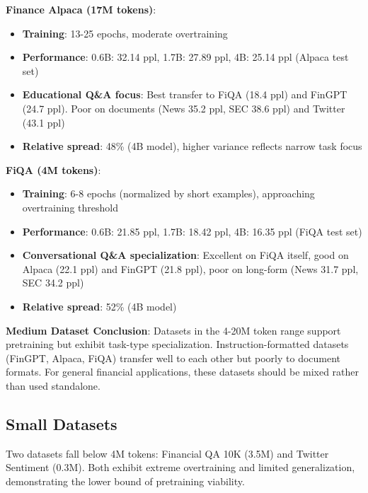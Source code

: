 \textbf{Finance Alpaca (17M tokens)}:
\begin{itemize}
\item \textbf{Training}: 13-25 epochs, moderate overtraining
\item \textbf{Performance}: 0.6B: 32.14 ppl, 1.7B: 27.89 ppl, 4B: 25.14 ppl (Alpaca test set)
\item \textbf{Educational Q\&A focus}: Best transfer to FiQA (18.4 ppl) and FinGPT (24.7 ppl). Poor on documents (News 35.2 ppl, SEC 38.6 ppl) and Twitter (43.1 ppl)
\item \textbf{Relative spread}: 48\% (4B model), higher variance reflects narrow task focus
\end{itemize}

\textbf{FiQA (4M tokens)}:
\begin{itemize}
\item \textbf{Training}: 6-8 epochs (normalized by short examples), approaching overtraining threshold
\item \textbf{Performance}: 0.6B: 21.85 ppl, 1.7B: 18.42 ppl, 4B: 16.35 ppl (FiQA test set)
\item \textbf{Conversational Q\&A specialization}: Excellent on FiQA itself, good on Alpaca (22.1 ppl) and FinGPT (21.8 ppl), poor on long-form (News 31.7 ppl, SEC 34.2 ppl)
\item \textbf{Relative spread}: 52\% (4B model)
\end{itemize}

\textbf{Medium Dataset Conclusion}: Datasets in the 4-20M token range support pretraining but exhibit task-type specialization. Instruction-formatted datasets (FinGPT, Alpaca, FiQA) transfer well to each other but poorly to document formats. For general financial applications, these datasets should be mixed rather than used standalone.

\subsection{Small Datasets}

Two datasets fall below 4M tokens: Financial QA 10K (3.5M) and Twitter Sentiment (0.3M). Both exhibit extreme overtraining and limited generalization, demonstrating the lower bound of pretraining viability.

